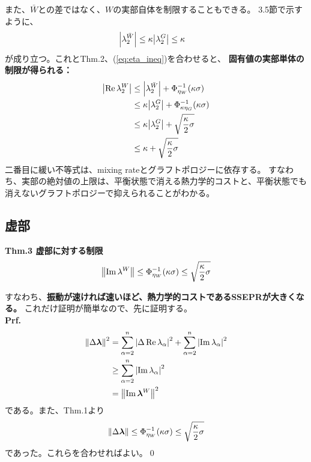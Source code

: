 \documentclass[a4paper,11pt]{jsarticle}
\numberwithin{equation}{section}
\begin{document}
また、$\bar{W}$との差ではなく、$W$の実部自体を制限することもできる。
3.5節で示すように、
\begin{align}
    \abs{\lambda_2^{\bar{W}}} &\leq \kappa \abs{\lambda_2^{G} } \leq \kappa \label{eq:lambda2_barW}
\end{align}
が成り立つ。これとThm.2、(\ref{eq:eta_ineq})を合わせると、
\textbf{固有値の実部単体の制限が得られる：}
\begin{align}
    \abs{\Re \lambda_2^W} &\leq \abs{\lambda_2^{\bar{W}}} + \Phi_{\eta_{W}}^{-1}(\kappa \sigma)\\
    &\leq \kappa \abs{\lambda_2^{G} } + \Phi_{\kappa \eta_{G}}^{-1}(\kappa \sigma)\\
    &\leq \kappa\abs{\lambda_2^{G}} + \sqrt{\frac{\kappa}{2} \sigma}\\
    &\leq \kappa + \sqrt{\frac{\kappa}{2} \sigma}
\end{align}
二番目に緩い不等式は、mixing rateとグラフトポロジーに依存する。
すなわち、実部の絶対値の上限は、平衡状態で消える熱力学的コストと、平衡状態でも消えないグラフトポロジーで抑えられることがわかる。

\subsection{虚部}
\begin{itembox}[l]{\textbf{Thm.3 虚部に対する制限}}
    \begin{align}
        \norm{\Im \lambda^W} \leq \Phi_{\eta_{W}}^{-1}(\kappa \sigma) \leq \sqrt{\frac{\kappa}{2} \sigma} \label{eq:thm3}
    \end{align}
\end{itembox}
すなわち、\textbf{振動が速ければ速いほど、熱力学的コストであるSSEPRが大きくなる。}
これだけ証明が簡単なので、先に証明する。\\
\textbf{Prf.}\\
\begin{align}
    \norm{\Delta \bm{\lambda}} ^2 &= \sum_{\alpha=2}^n \abs{\Delta \Re \lambda_{\alpha}}^2 + \sum_{\alpha=2}^n \abs{\Im \lambda_{\alpha}}^2\\
    &\geq \sum_{\alpha=2}^n \abs{\Im \lambda_{\alpha}}^2\\
    &= \norm{\Im \bm{\lambda}^W}^2
\end{align}
である。また、Thm.1より
\begin{align}
    \norm{\Delta \bm{\lambda}} \leq \Phi_{\eta_{W}}^{-1}(\kappa \sigma) \leq \sqrt{\frac{\kappa}{2} \sigma}
\end{align}
であった。これらを合わせればよい。\qed\\
\end{document}
